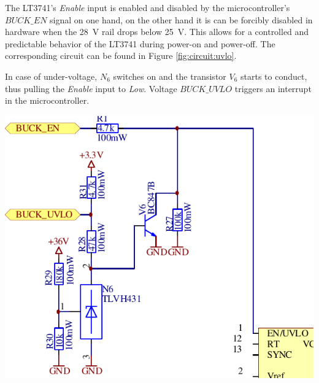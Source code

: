\begin{minipage}{0.5\textwidth}
    The  LT3741's  \emph{Enable}   input  is  enabled  and   disabled  by  the
    microcontroller's $BUCK\_EN$ signal  on one hand, on the other  hand it is
    can  be  forcibly  disabled  in  hardware  when  the  \SI{28}{\volt}  rail
    drops below  \SI{25}{\volt}. This allows for a  controlled and predictable
    behavior of  the LT3741  during power-on and  power-off. The corresponding
    circuit can be found in Figure \ref{fig:circuit:uvlo}.

    In  case of  under-voltage, $N_6$  switches  on and  the transistor  $V_6$
    starts to  conduct, thus  pulling the  \emph{Enable} input  to \emph{Low}.
    Voltage $BUCK\_UVLO$ triggers an interrupt in the microcontroller.
\end{minipage}
\begin{minipage}{0.5\textwidth}
    \center
    \includegraphics[width=.8\textwidth]{images/circuit/uvlo.pdf}
    \label{fig:circuit:uvlo}
\end{minipage}
